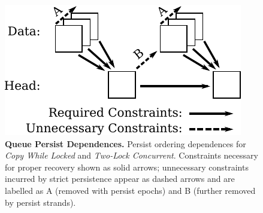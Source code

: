 \begin{figure}
  \centering
  \includegraphics[width=.66\linewidth]{PersistencyModels/CWL_2LC_dependences.pdf}
  \caption{\textbf{Queue Persist Dependences.} Persist ordering dependences for \emph{Copy While Locked} and \emph{Two-Lock Concurrent}.  Constraints necessary for proper recovery shown as solid arrows; unnecessary constraints incurred by strict persistence appear as dashed arrows and are labelled as A (removed with persist epochs) and B (further removed by persist strands).}
  \label{fig::CWL_dependences}
\end{figure}
